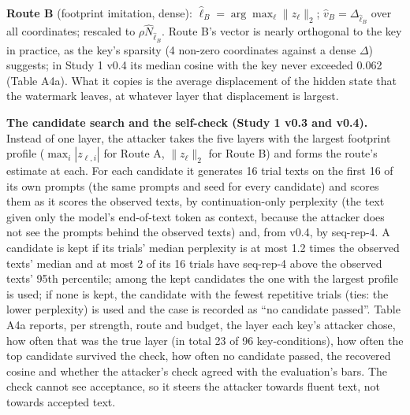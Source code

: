 \documentclass[11pt,letterpaper]{article}
\begin{document}
\textbf{Route B} (footprint imitation, dense): \(\hat\ell_B = \arg\max_\ell \lVert z_\ell \rVert_2\); \(\hat v_B = \Delta_{\hat\ell_B}\) over all coordinates; rescaled to \(\rho \hat N_{\hat\ell_B}\). Route B's vector is nearly orthogonal to the key in practice, as the key's sparsity (4 non-zero coordinates against a dense \(\Delta\)) suggests; in Study 1 v0.4 its median cosine with the key never exceeded 0.062 (Table A4a). What it copies is the average displacement of the hidden state that the watermark leaves, at whatever layer that displacement is largest.

\textbf{The candidate search and the self-check (Study 1 v0.3 and v0.4).} Instead of one layer, the attacker takes the five layers with the largest footprint profile (\(\max_i |z_{\ell, i}|\) for Route A, \(\lVert z_\ell \rVert_2\) for Route B) and forms the route's estimate at each. For each candidate it generates 16 trial texts on the first 16 of its own prompts (the same prompts and seed for every candidate) and scores them as it scores the observed texts, by continuation-only perplexity (the text given only the model's end-of-text token as context, because the attacker does not see the prompts behind the observed texts) and, from v0.4, by seq-rep-4. A candidate is kept if its trials' median perplexity is at most 1.2 times the observed texts' median and at most 2 of its 16 trials have seq-rep-4 above the observed texts' 95th percentile; among the kept candidates the one with the largest profile is used; if none is kept, the candidate with the fewest repetitive trials (ties: the lower perplexity) is used and the case is recorded as ``no candidate passed''. Table A4a reports, per strength, route and budget, the layer each key's attacker chose, how often that was the true layer (in total 23 of 96 key-conditions), how often the top candidate survived the check, how often no candidate passed, the recovered cosine and whether the attacker's check agreed with the evaluation's bars. The check cannot see acceptance, so it steers the attacker towards fluent text, not towards accepted text.
\end{document}
